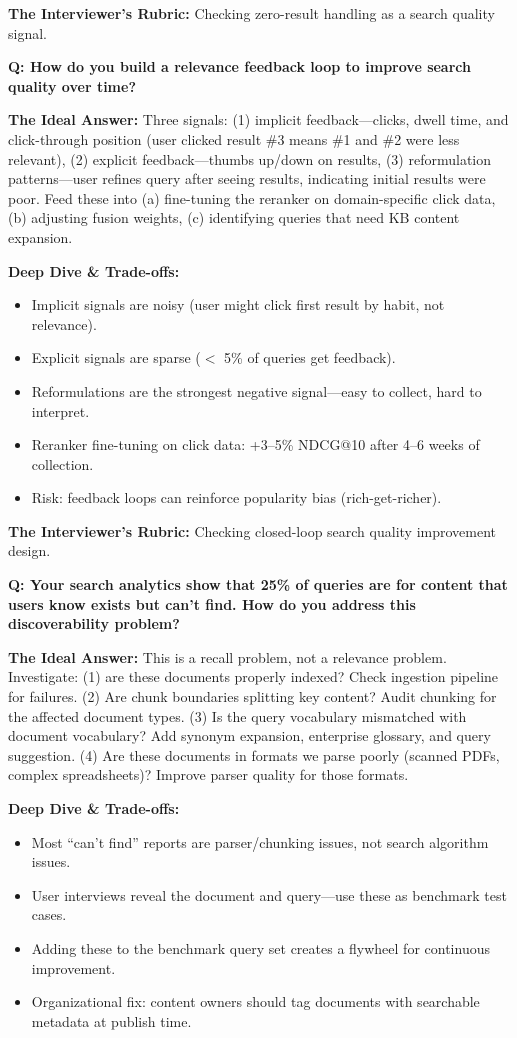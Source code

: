 \textbf{The Interviewer's Rubric:} Checking zero-result handling as a search quality signal.

\textbf{Q: How do you build a relevance feedback loop to improve search quality over time?}

\textbf{The Ideal Answer:} Three signals: (1) implicit feedback---clicks, dwell time, and click-through position (user clicked result \#3 means \#1 and \#2 were less relevant), (2) explicit feedback---thumbs up/down on results, (3) reformulation patterns---user refines query after seeing results, indicating initial results were poor. Feed these into (a) fine-tuning the reranker on domain-specific click data, (b) adjusting fusion weights, (c) identifying queries that need KB content expansion.

\textbf{Deep Dive \& Trade-offs:}
\begin{itemize}
  \item Implicit signals are noisy (user might click first result by habit, not relevance).
  \item Explicit signals are sparse ($<$ 5\% of queries get feedback).
  \item Reformulations are the strongest negative signal---easy to collect, hard to interpret.
  \item Reranker fine-tuning on click data: +3--5\% NDCG@10 after 4--6 weeks of collection.
  \item Risk: feedback loops can reinforce popularity bias (rich-get-richer).
\end{itemize}

\textbf{The Interviewer's Rubric:} Checking closed-loop search quality improvement design.

\textbf{Q: Your search analytics show that 25\% of queries are for content that users know exists but can't find. How do you address this discoverability problem?}

\textbf{The Ideal Answer:} This is a recall problem, not a relevance problem. Investigate: (1) are these documents properly indexed? Check ingestion pipeline for failures. (2) Are chunk boundaries splitting key content? Audit chunking for the affected document types. (3) Is the query vocabulary mismatched with document vocabulary? Add synonym expansion, enterprise glossary, and query suggestion. (4) Are these documents in formats we parse poorly (scanned PDFs, complex spreadsheets)? Improve parser quality for those formats.

\textbf{Deep Dive \& Trade-offs:}
\begin{itemize}
  \item Most ``can't find'' reports are parser/chunking issues, not search algorithm issues.
  \item User interviews reveal the document and query---use these as benchmark test cases.
  \item Adding these to the benchmark query set creates a flywheel for continuous improvement.
  \item Organizational fix: content owners should tag documents with searchable metadata at publish time.
\end{itemize}

